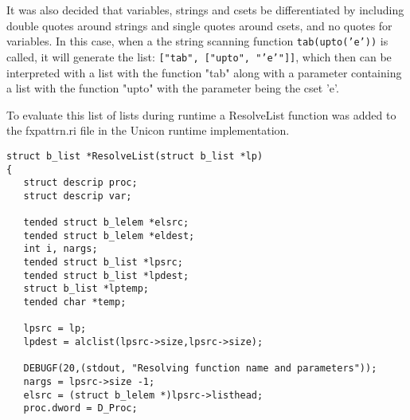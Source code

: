 \documentclass{article}
\begin{document}
It was also decided that variables, strings and csets be differentiated by including double quotes around strings and single quotes around csets, and no quotes for variables.  In this case, when a the string scanning function \texttt{tab(upto('e'))} is called, it will generate the list: \texttt{["tab", ["upto", "'e'"]]}, which then can be interpreted with a list with the function "tab" along with a parameter containing a list with the function "upto" with the parameter being the cset 'e'.

To evaluate this list of lists during runtime a ResolveList function was added to the fxpattrn.ri file in the Unicon runtime implementation.  
\begin{verbatim}
struct b_list *ResolveList(struct b_list *lp)
{
   struct descrip proc;
   struct descrip var;

   tended struct b_lelem *elsrc;
   tended struct b_lelem *eldest;
   int i, nargs;
   tended struct b_list *lpsrc;
   tended struct b_list *lpdest;
   struct b_list *lptemp;
   tended char *temp;
 
   lpsrc = lp;
   lpdest = alclist(lpsrc->size,lpsrc->size);

   DEBUGF(20,(stdout, "Resolving function name and parameters"));
   nargs = lpsrc->size -1;
   elsrc = (struct b_lelem *)lpsrc->listhead;
   proc.dword = D_Proc;


\end{verbatim}
\end{document}
